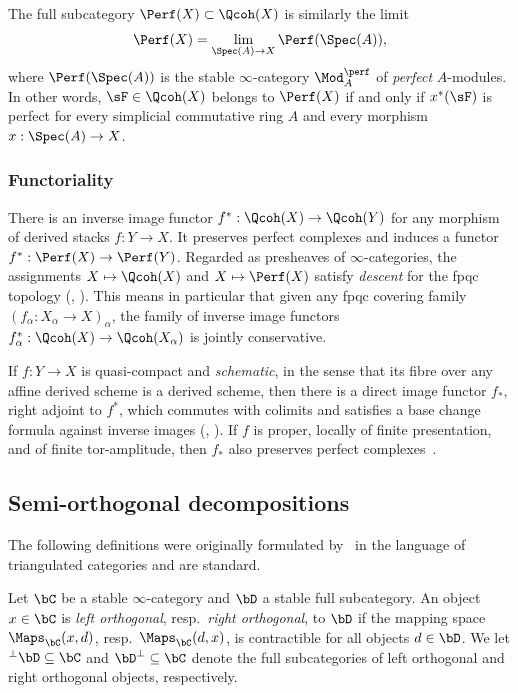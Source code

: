 The full subcategory $\Perf(X) \subset \Qcoh(X)$ is similarly the limit
\[
\Perf(X) = \lim_{\Spec(A) \to X} \Perf(\Spec(A)),
\]
where $\Perf(\Spec(A))$ is the stable $\infty$-category $\Mod_A^\perf$ of \emph{perfect} $A$-modules. In other words, $\sF \in \Qcoh(X)$ belongs to $\Perf(X)$ if and only if $x^*(\sF)$ is perfect for every simplicial commutative ring $A$ and every morphism $x : \Spec(A) \to X$.

\subsubsection{Functoriality}\label{sssec:Qcoh functoriality}

There is an inverse image functor $f^* : \Qcoh(X) \to \Qcoh(Y)$ for any morphism of derived stacks $f : Y \to X$. It preserves perfect complexes and induces a functor $f^* : \Perf(X) \to \Perf(Y)$. Regarded as presheaves of $\infty$-categories, the assignments $X \mapsto \Qcoh(X)$ and $X \mapsto \Perf(X)$ satisfy \emph{descent} for the fpqc topology (\cite[Corollary~D.6.3.3]{SAG-20180204}, \cite[Theorem~1.3.4]{GaitsgoryRozenblyum}). This means in particular that given any fpqc covering family $(f_\alpha : X_\alpha \to X)_\alpha$, the family of inverse image functors $f_\alpha^* : \Qcoh(X) \to \Qcoh(X_\alpha)$ is jointly conservative.

If $f : Y \to X$ is quasi-compact and \emph{schematic}, in the sense that its fibre over any affine derived scheme is a derived scheme, then there is a direct image functor $f_*$, right adjoint to $f^*$, which commutes with colimits and satisfies a base change formula against inverse images (\cite[Proposition~2.5.4.5]{SAG-20180204}, \cite[Volume~1, Chapter~3, Proposition~2.2.2]{GaitsgoryRozenblyum}). If $f$ is proper, locally of finite presentation, and of finite tor-amplitude, then $f_*$ also preserves perfect complexes~\cite[Theorem~6.1.3.2]{SAG-20180204}.

\subsection{Semi-orthogonal decompositions}

The following definitions were originally formulated by~\cite{BondalKapranov} in the language of triangulated categories and are standard.

\begin{defi}
Let $\bC$ be a stable $\infty$-category and $\bD$ a stable full subcategory. An object $x \in \bC$ is \emph{left orthogonal}, resp.~\emph{right orthogonal}, to $\bD$ if the mapping space $\Maps_\bC(x,d)$, resp.~$\Maps_\bC(d,x)$, is contractible for all objects $d\in\bD$. We let $^\perp\bD \subseteq \bC$ and $\bD^\perp \subseteq \bC$ denote the full subcategories of left orthogonal and right orthogonal objects, respectively.
\end{defi}

